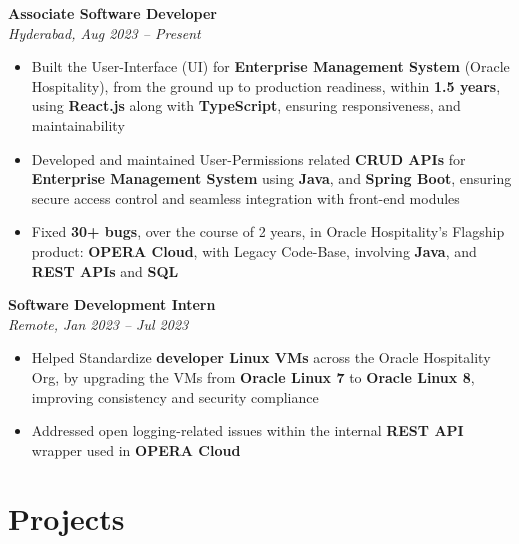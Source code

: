 \documentclass[a4paper,8pt]{article}
\begin{document}
\textbf{Associate Software Developer} \\ \textit{Hyderabad, Aug 2023 -- Present}
\begin{itemize}[leftmargin=1.5em]
  \item Built the User-Interface (UI) for \textbf{Enterprise Management System} (Oracle Hospitality), from the ground up to production readiness, within \textbf{1.5 years}, using \textbf{React.js} along with \textbf{TypeScript}, ensuring responsiveness, and maintainability 
  \item Developed and maintained User-Permissions related \textbf{CRUD APIs} for \textbf{Enterprise Management System} using \textbf{Java}, and \textbf{Spring Boot}, ensuring secure access control and seamless integration with front-end modules
  \item Fixed \textbf{30+ bugs}, over the course of 2 years, in Oracle Hospitality's Flagship product: \textbf{OPERA Cloud}, with Legacy Code-Base, involving \textbf{Java}, and \textbf{REST APIs} and \textbf{SQL}
\end{itemize}
\textbf{Software Development Intern} \\ \textit{Remote, Jan 2023 -- Jul 2023}
\begin{itemize}[leftmargin=1.5em]
  \item Helped Standardize \textbf{developer Linux VMs} across the Oracle Hospitality Org, by upgrading the VMs from \textbf{Oracle Linux 7} to \textbf{Oracle Linux 8}, improving consistency and security compliance 
  \item Addressed open logging-related issues within the internal \textbf{REST API} wrapper used in \textbf{OPERA Cloud}
\end{itemize}

\section*{\faRocket\hspace{0.5em}Projects}
\end{document}
